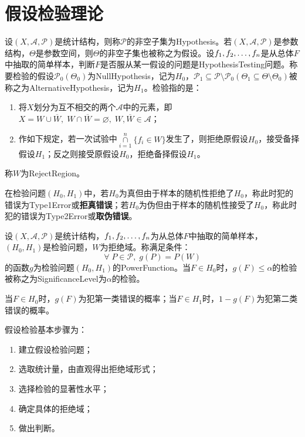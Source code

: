 \chapter{假设检验理论}
\begin{definition}
	设$(X,\mathscr{A},\mathscr{P})$是统计结构，则称$\mathscr{P}$的非空子集为\gls{Hypothesis}。若$(X,\mathscr{A},\mathscr{P})$是参数结构，$\Theta$是参数空间，则$\Theta$的非空子集也被称之为假设。设$f_1, f_2, \dots, f_{n}$是从总体$F$中抽取的简单样本，判断$F$是否服从某一假设的问题是\gls{HypothesisTesting}问题。称要检验的假设$\mathscr{P}_0(\Theta_0)$为\gls{NullHypothesis}，记为$H_0$，$\mathscr{P}_1\subseteq\mathscr{P}\setminus\mathscr{P}_0(\Theta_1\subseteq\Theta\setminus\Theta_0)$被称之为\gls{AlternativeHypothesis}，记为$H_1$。检验指的是：
	\begin{enumerate}
		\item 将$X$划分为互不相交的两个$\mathscr{A}$中的元素，即$X=W\cup\overline{W},\;W\cap\overline{W}=\varnothing,\;W,\overline{W}\in\mathscr{A}$；
		\item 作如下规定，若一次试验中$\underset{i=1}{\overset{n}{\cap}}\{f_i\in W\}$发生了，则拒绝原假设$H_0$，接受备择假设$H_1$；反之则接受原假设$H_0$，拒绝备择假设$H_1$。
	\end{enumerate}
	称$W$为\gls{RejectRegion}。
\end{definition}
\begin{definition}
	在检验问题$(H_0,H_1)$中，若$H_0$为真但由于样本的随机性拒绝了$H_0$，称此时犯的错误为\gls{Type1Error}或\textbf{拒真错误}；若$H_0$为伪但由于样本的随机性接受了$H_0$，称此时犯的错误为\gls{Type2Error}或\textbf{取伪错误}。
\end{definition}
\begin{definition}
	设$(X,\mathscr{A},\mathscr{P})$是统计结构，$f_1, f_2, \dots, f_{n}$为从总体$F$中抽取的简单样本，$(H_0,H_1)$是检验问题，$W$为拒绝域。称满足条件：
	\begin{equation*}
		\forall\;P\in\mathscr{P},\;g(P)=P(W)
	\end{equation*}
	的函数$g$为检验问题$(H_0,H_1)$的\gls{PowerFunction}。当$F\in H_0$时，$g(F)\leqslant\alpha$的检验被称之为\gls{SignificanceLevel}为$\alpha$的检验。
\end{definition}
\begin{note}
	当$F\in H_0$时，$g(F)$为犯第一类错误的概率；当$F\in H_1$时，$1-g(F)$为犯第二类错误的概率。
\end{note}
\begin{method}
	假设检验基本步骤为：
	\begin{enumerate}
		\item 建立假设检验问题；
		\item 选取统计量，由直观得出拒绝域形式；
		\item 选择检验的显著性水平；
		\item 确定具体的拒绝域；
		\item 做出判断。
	\end{enumerate}
\end{method}
